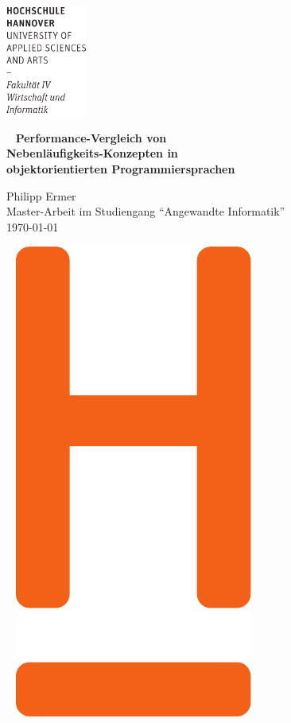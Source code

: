 \documentclass[fontsize=12pt,paper=a4,twoside=semi,parskip=half-,headsepline,headinclude]{scrreprt}
\begin{document}
	\renewcommand{\figurename}{Abb.}
	
  \thispagestyle{empty} %
\includegraphics[width=0.2\textwidth]{hsh_icons/Wortmarke_WI_schwarz}

   {  ~ \sffamily
  \vfill
  {\Huge\bfseries Performance-Vergleich von \\Nebenläufigkeits-Konzepten in \\objektorientierten Programmiersprachen}
  \bigskip

  {\Large 
  Philipp Ermer \\[2ex]
 Master-Arbeit im Studiengang "`Angewandte Informatik"' 
 \\[5ex]
   \today } 
}
 \vfill
  
  ~ \hfill
  \includegraphics[height=0.3\paperheight]{hsh_icons/H_WI_Pantone1665} 
\end{document}
